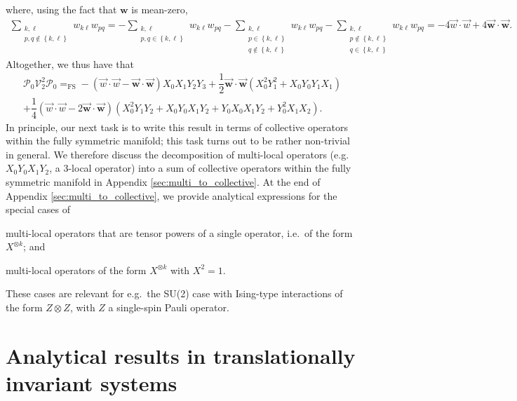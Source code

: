 \documentclass[nofootinbib,notitlepage,11pt]{revtex4-2}
\newcommand{\f}[2]{\dfrac{#1}{#2}} %
\newcommand{\p}[1]{\left(#1\right)} %
\renewcommand{\set}[1]{\left\{#1\right\}} %
\renewcommand{\c}{\cdot} %
\newcommand{\m}{\bm} %
\renewcommand{\v}{\vec} %
\newcommand{\1}{\mathds{1}}
\renewcommand{\P}{\mathcal{P}}
\newcommand{\V}{\mathcal{V}}
\newcommand{\EQFS}{=_{\text{FS}}}
\begin{document}
where, using the fact that $\m w$ is mean-zero,
\begin{align}
  \sum_{\substack{k,\ell\\p,q\notin\set{k,\ell}}} w_{k\ell} w_{pq}
  = - \sum_{\substack{k,\ell\\p,q\in\set{k,\ell}}} w_{k\ell} w_{pq}
  - \sum_{\substack{k,\ell\\p\in\set{k,\ell}\\q\notin\set{k,\ell}}}
  w_{k\ell} w_{pq}
  - \sum_{\substack{k,\ell\\p\notin\set{k,\ell}\\q\in\set{k,\ell}}}
  w_{k\ell} w_{pq}
  = -4 \v w\c\v w + 4 \v{\m w}\c\v{\m w}.
\end{align}
Altogether, we thus have that
\begin{multline}
  \P_0 \V_2^2 \P_0
  \EQFS -\p{\v w\c\v w - \v{\m w}\c\v{\m w}} X_0 X_1 Y_2 Y_3
  + \f12 \v{\m w}\c\v{\m w} \p{X_0^2 Y_1^2 + X_0 Y_0 Y_1 X_1} \\
  + \f14 \p{\v w\c\v w - 2\v{\m w}\c\v{\m w}}
  \p{X_0^2 Y_1 Y_2 + X_0 Y_0 X_1 Y_2
    + Y_0 X_0 X_1 Y_2 + Y_0^2 X_1 X_2}.
  \label{eq:PXYXYP}
\end{multline}
In principle, our next task is to write this result in terms of
collective operators within the fully symmetric manifold; this task
turns out to be rather non-trivial in general.  We therefore discuss
the decomposition of multi-local operators (e.g.~$X_0Y_0X_1Y_2$, a
3-local operator) into a sum of collective operators within the fully
symmetric manifold in Appendix \ref{sec:multi_to_collective}.  At the
end of Appendix \ref{sec:multi_to_collective}, we provide analytical
expressions for the special cases of
\begin{enumerate*}
\item multi-local operators that are tensor powers of a single
  operator, i.e.~of the form $X^{\otimes k}$; and
\item multi-local operators of the form $X^{\otimes k}$ with $X^2=1$.
\end{enumerate*}
These cases are relevant for e.g.~the SU(2) case with Ising-type
interactions of the form $Z\otimes Z$, with $Z$ a single-spin Pauli
operator.

\section{Analytical results in translationally invariant systems}
\label{sec:trans_inv}
\end{document}
